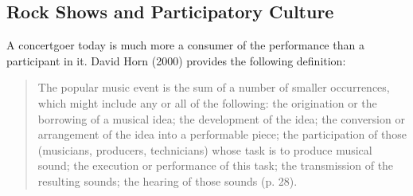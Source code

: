 \subsection{Rock Shows and Participatory Culture}

A concertgoer today is much more a consumer of the performance than a participant in it. David Horn (2000) provides the following definition:

\begin{quotation}
\onehalfspacing	
The popular music event is the sum of a number of smaller occurrences, which might include any or all of the following: the origination or the borrowing of a musical idea; the development of the idea; the conversion or arrangement of the idea into a performable piece; the participation of those (musicians, producers, technicians) whose task is to produce musical sound; the execution or performance of this task; the transmission of the resulting sounds; the hearing of those sounds (p. 28).
\end{quotation}

